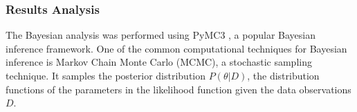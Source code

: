 

\subsubsection{Results Analysis}
    

The Bayesian analysis was performed using PyMC3 \cite{salvatier2016probabilistic}, 
a popular Bayesian inference framework. 
One of the common computational techniques 
for Bayesian inference is Markov Chain Monte Carlo (MCMC), 
a stochastic sampling technique. 
It samples the posterior distribution $P(\theta | D)$, 
the distribution functions of the parameters 
in the likelihood function given the data observations $D$. 


